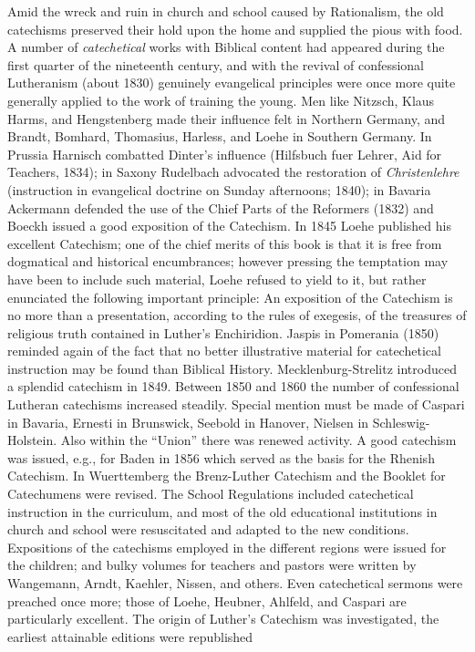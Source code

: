 Amid the wreck and ruin in church and school caused by Rationalism, the old catechisms preserved their hold upon the home and supplied the pious with food. A number of \emph{catechetical} works with Biblical content had appeared during the first quarter of the nineteenth century, and with the revival of confessional Lutheranism (about 1830) genuinely evangelical principles were once more quite generally applied to the work of training the young. Men like Nitzsch, Klaus Harms, and Hengstenberg made their influence felt in Northern Germany, and Brandt, Bomhard, Thomasius, Harless, and Loehe in Southern Germany. In Prussia Harnisch combatted Dinter’s influence (Hilfsbuch fuer Lehrer, Aid for Teachers, 1834); in Saxony Rudelbach advocated the restoration
of \emph{Christenlehre} (instruction in evangelical doctrine on Sunday afternoons; 1840); in Bavaria Ackermann defended the use of the Chief Parts of the Reformers (1832) and Boeckh issued a good exposition of the Catechism. In 1845 Loehe published his excellent Catechism; one of the chief merits of this book is that it is free from dogmatical and historical encumbrances; however pressing the temptation may have been to include such material, Loehe refused to yield to it, but rather enunciated the following important principle: An exposition of the Catechism is no more than a presentation, according to the rules of exegesis, of the treasures of religious truth contained in Luther’s Enchiridion. Jaspis in Pomerania (1850) reminded again of the fact that no better illustrative material for catechetical instruction may be found than Biblical History. Mecklenburg-Strelitz introduced a splendid catechism in 1849. Between 1850 and 1860 the number of confessional Lutheran catechisms increased steadily. Special mention must be made of Caspari in Bavaria, Ernesti in Brunswick, Seebold in Hanover, Nielsen in Schleswig-Holstein. Also within the “Union” there was renewed activity. A good catechism was issued, e.g., for Baden in 1856 which served as the basis for the Rhenish Catechism. In Wuerttemberg the Brenz-Luther Catechism and the Booklet for Catechumens were revised. The School Regulations included catechetical instruction in the curriculum, and most of the old educational institutions in church and school were resuscitated and adapted to the new conditions. Expositions of the catechisms employed in the different regions were issued for the children; and bulky volumes for teachers and pastors were written by Wangemann, Arndt, Kaehler, Nissen, and others. Even catechetical sermons were preached once more; those of Loehe, Heubner, Ahlfeld, and Caspari are particularly excellent. The origin of Luther’s Catechism was investigated, the earliest attainable editions were republished
